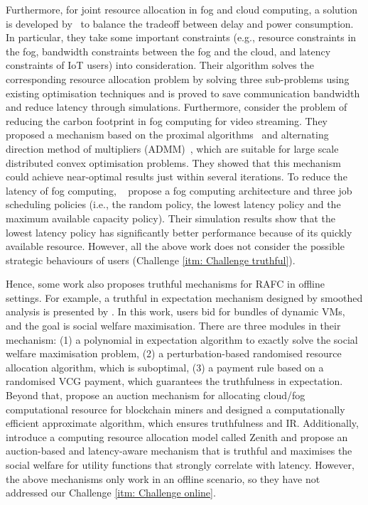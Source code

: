 \documentclass[11pt]{phdthesis}
\begin{document}
Furthermore, for joint resource allocation in fog and cloud computing, a solution is developed by~\cite{deng2015towards} to balance the tradeoff between delay and power consumption. In particular, they take some important constraints (e.g., resource constraints in the fog, bandwidth constraints between the fog and the cloud, and latency constraints of IoT users) into consideration. Their algorithm solves the corresponding resource allocation problem by solving three sub-problems using existing optimisation techniques and is proved to save communication bandwidth and reduce latency through simulations. Furthermore, \citet{do2015proximal} consider the problem of reducing the carbon footprint in fog computing for video streaming. They proposed a mechanism based on the proximal algorithms~\citep{parikh2014proximal} and alternating direction method of multipliers (ADMM)~\citep{boyd2011distributed}, which are suitable for large scale distributed convex optimisation problems. They showed that this mechanism could achieve near-optimal results just within several iterations. To reduce the latency of fog computing, ~\citet{intharawijitr2016analysis} propose a fog computing architecture and three job scheduling policies (i.e., the random policy, the lowest latency policy and the maximum available capacity policy). Their simulation results show that the lowest latency policy has significantly better performance because of its quickly available resource. However, all the above work does not consider the possible strategic behaviours of users (Challenge \ref{itm: Challenge truthful}).

Hence, some work also proposes truthful mechanisms for RAFC in offline settings. For example, a truthful in expectation mechanism designed by smoothed analysis is presented by \citet{zhang2015truthful}. In this work, users bid for bundles of dynamic VMs, and the goal is social welfare maximisation. There are three modules in their mechanism: (1) a polynomial in expectation algorithm to exactly solve the social welfare maximisation problem, (2) a perturbation-based randomised resource allocation algorithm, which is suboptimal, (3) a payment rule based on a randomised VCG payment, which guarantees the truthfulness in expectation. Beyond that, \citet{jiao2018auction} propose an auction mechanism for allocating cloud/fog computational resource for blockchain miners and designed a computationally efficient approximate algorithm, which ensures truthfulness and IR. Additionally, \citet{xu2017zenith} introduce a computing resource allocation model called Zenith and propose an auction-based and latency-aware mechanism that is truthful and maximises the social welfare for utility functions that strongly correlate with latency. However, the above mechanisms only work in an offline scenario, so they have not addressed our Challenge \ref{itm: Challenge online}. 
\end{document}

